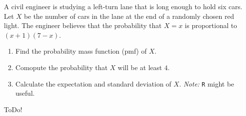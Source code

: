 
\begin{exercise}

A civil engineer is studying a left-turn lane that is long enough to hold six cars.
Let $X$ be the number of cars in the lane at the end of a randomly chosen red light.
The engineer believes that the probability that $X = x$ is proportional to $(x + 1) (7 - x)$.

\begin{enumerate}[label = (\alph*)]

    \item Find the probability mass function (pmf) of $X$.

    \item Comopute the probability that $X$ will be at least $4$.

    \item Calculate the expectation and standard deviation of $X$.
    \textit{Note:} \texttt{R} might be useful.

\end{enumerate}

\end{exercise}


\begin{solution}

ToDo!

\end{solution}

